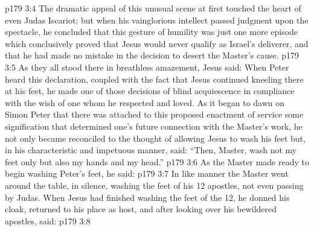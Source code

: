 \vs p179 3:4 The dramatic appeal of this unusual scene at first touched the heart of even Judas Iscariot; but when his vainglorious intellect passed judgment upon the spectacle, he concluded that this gesture of humility was just one more episode which conclusively proved that Jesus would never qualify as Israel’s deliverer, and that he had made no mistake in the decision to desert the Master’s cause.
\vs p179 3:5 As they all stood there in breathless amazement, Jesus said:  When Peter heard this declaration, coupled with the fact that Jesus continued kneeling there at his feet, he made one of those decisions of blind acquiescence in compliance with the wish of one whom he respected and loved. As it began to dawn on Simon Peter that there was attached to this proposed enactment of service some signification that determined one’s future connection with the Master’s work, he not only became reconciled to the thought of allowing Jesus to wash his feet but, in his characteristic and impetuous manner, said: “Then, Master, wash not my feet only but also my hands and my head.”
\vs p179 3:6 As the Master made ready to begin washing Peter’s feet, he said: 
\vs p179 3:7 In like manner the Master went around the table, in silence, washing the feet of his 12 apostles, not even passing by Judas. When Jesus had finished washing the feet of the 12, he donned his cloak, returned to his place as host, and after looking over his bewildered apostles, said:
\vs p179 3:8 \pc {}
